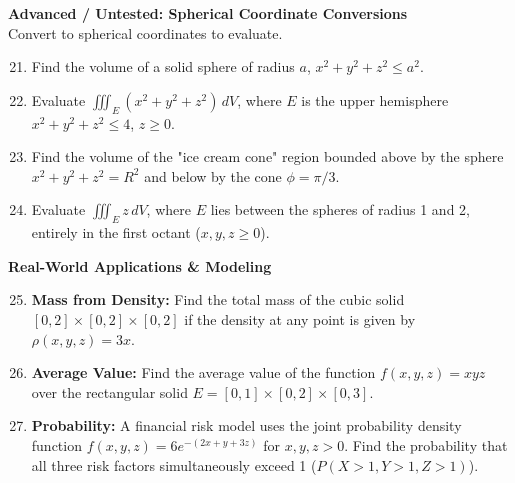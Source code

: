 \documentclass[11pt]{article}
\begin{document}
\textbf{Advanced / Untested: Spherical Coordinate Conversions} \\
Convert to spherical coordinates to evaluate.
\begin{enumerate}
\setcounter{enumi}{20}
    \item Find the volume of a solid sphere of radius $a$, $x^2+y^2+z^2 \le a^2$.
    \item Evaluate $\displaystyle \iiint_E (x^2+y^2+z^2) \,dV$, where $E$ is the upper hemisphere $x^2+y^2+z^2 \le 4$, $z \ge 0$.
    \item Find the volume of the "ice cream cone" region bounded above by the sphere $x^2+y^2+z^2=R^2$ and below by the cone $\phi = \pi/3$.
    \item Evaluate $\displaystyle \iiint_E z \,dV$, where $E$ lies between the spheres of radius 1 and 2, entirely in the first octant ($x,y,z \ge 0$).
\end{enumerate}

\textbf{Real-World Applications \& Modeling}
\begin{enumerate}
\setcounter{enumi}{24}
    \item \textbf{Mass from Density:} Find the total mass of the cubic solid $[0,2] \times [0,2] \times [0,2]$ if the density at any point is given by $\rho(x,y,z) = 3x$.
    \item \textbf{Average Value:} Find the average value of the function $f(x,y,z) = xyz$ over the rectangular solid $E = [0,1] \times [0,2] \times [0,3]$.
    \item \textbf{Probability:} A financial risk model uses the joint probability density function $f(x,y,z) = 6e^{-(2x+y+3z)}$ for $x,y,z > 0$. Find the probability that all three risk factors simultaneously exceed 1 ($P(X>1, Y>1, Z>1)$).
\end{enumerate}
\end{document}
